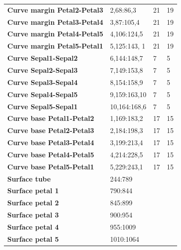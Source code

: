 \documentclass[10pt,letter,english]{article}
\begin{document}
\begin{table}[H]
\begin{tabular}{llll}
{\color[HTML]{FBBC04} \textbf{Curve margin Petal2-Petal3}} & 2,68:86,3 & 21 & 19 \\
{\color[HTML]{FBBC04} \textbf{Curve margin Petal3-Petal4}} & 3,87:105,4 & 21 & 19 \\
{\color[HTML]{FBBC04} \textbf{Curve margin Petal4-Petal5}} & 4,106:124,5 & 21 & 19 \\
{\color[HTML]{FBBC04} \textbf{Curve margin Petal5-Petal1}} & 5,125:143, 1 & 21 & 19 \\
\hline
{\color[HTML]{FBBC04} \textbf{Curve Sepal1-Sepal2}} & 6,144:148,7 & 7 & 5 \\ 
{\color[HTML]{FBBC04} \textbf{Curve Sepal2-Sepal3}} & 7,149:153,8 & 7 & 5 \\
{\color[HTML]{FBBC04} \textbf{Curve Sepal3-Sepal4}} & 8,154:158,9 & 7 & 5 \\
{\color[HTML]{FBBC04} \textbf{Curve Sepal4-Sepal5}} & 9,159:163,10 & 7 & 5 \\
{\color[HTML]{FBBC04} \textbf{Curve Sepal5-Sepal1}} & 10,164:168,6 & 7 & 5 \\
\hline
{\color[HTML]{FBBC04} \textbf{Curve base Petal1-Petal2}} & 1,169:183,2 & 17 & 15 \\
{\color[HTML]{FBBC04} \textbf{Curve base Petal2-Petal3}} & 2,184:198,3 & 17 & 15 \\
{\color[HTML]{FBBC04} \textbf{Curve base Petal3-Petal4}} & 3,199:213,4 & 17 & 15 \\
{\color[HTML]{FBBC04} \textbf{Curve base Petal4-Petal5}} & 4,214:228,5 & 17 & 15 \\
{\color[HTML]{FBBC04} \textbf{Curve base Petal5-Petal1}} & 5,229:243,1 & 17 & 15 \\
\hline
{\color[HTML]{4285F4} \textbf{Surface tube}} & 244:789 &  &  \\
{\color[HTML]{4285F4} \textbf{Surface petal 1}} & 790:844 &  &  \\
{\color[HTML]{4285F4} \textbf{Surface petal 2}} & 845:899 &  &  \\
{\color[HTML]{4285F4} \textbf{Surface petal 3}} & 900:954 &  &  \\
{\color[HTML]{4285F4} \textbf{Surface petal 4}} & 955:1009 &  &  \\
{\color[HTML]{4285F4} \textbf{Surface petal 5}} & 1010:1064 &  &  \\
\hline



\end{tabular}
\end{table}
\end{document}
